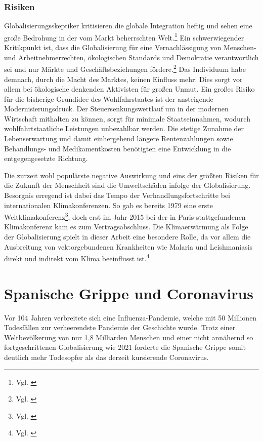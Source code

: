\documentclass[12pt]{article}
\begin{document}
\subsubsection{Risiken}
Globalisierungsskeptiker kritisieren die globale Integration heftig und sehen eine große Bedrohung in der vom Markt beherrschten Welt.\footnote{Vgl. \cite{Renz2001}} Ein schwerwiegender Kritikpunkt ist, dass die Globalisierung für eine Vernachlässigung von Menschen- und Arbeitnehmerrechten, ökologischen Standards und Demokratie verantwortlich sei und nur Märkte und Geschäftsbeziehungen fördere.\footnote{Vgl. \cite{IntGB2010}} Das Individuum habe demnach, durch die  Macht des Marktes, keinen Einfluss mehr. Dies sorgt vor allem bei ökologische denkenden Aktivisten für großen Unmut.
Ein großes Risiko für die bisherige Grundidee des Wohlfahrstaates ist der ansteigende Modernisierungsdruck. Der Steuersenkungswettlauf um in der modernen Wirtschaft mithalten zu können, sorgt für minimale Staatseinnahmen, wodurch wohlfahrtstaatliche Leistungen unbezahlbar werden. Die stetige Zunahme der Lebenserwartung und damit einhergehend längere Rentenzahlungen sowie Behandlungs- und Medikamentkosten benötigten eine Entwicklung in die entgegengesetzte Richtung.\newline

Die zurzeit wohl populärste negative Auswirkung und eins der größten Risiken für die Zukunft der Menschheit sind die Umweltschäden infolge der Globalisierung. Besorgnis erregend ist dabei das Tempo der Verhandlungsfortschritte bei internationalen Klimakonferenzen. So gab es bereits 1979 eine erste Weltklimakonferenz\footnote{Vgl. \cite{Weltklimakonferenzen}}, doch erst im Jahr 2015 bei der in Paris stattgefundenen Klimakonferenz kam es zum Vertragsabschluss. Die Klimaerwärmung als Folge der Globalisierung spielt in dieser Arbeit eine besondere Rolle, da vor allem die Ausbreitung von vektorgebundenen Krankheiten wie Malaria und Leishmaniasis direkt und indirekt vom Klima beeinflusst ist.\footnote{Vgl. \cite{Ebert2005}}

\section{Spanische Grippe und Coronavirus}\label{sec:GrippeUndCovid}
Vor 104 Jahren verbreitete sich eine Influenza-Pandemie, welche mit 50 Millionen Todesfällen zur verheerendste Pandemie der Geschichte wurde. %
Trotz einer Weltbevölkerung von nur 1,8 Milliarden Menschen und einer nicht annähernd so fortgeschrittenen Globalisierung wie 2021 forderte die Spanische Grippe somit deutlich mehr Todesopfer als das derzeit kursierende Coronavirus.
\end{document}
